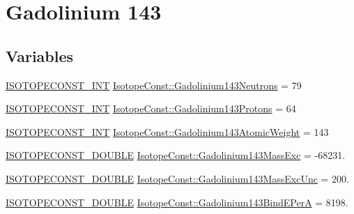 \hypertarget{group___isotope_const-_gadolinium-_gd143}{}\section{Gadolinium 143}
\label{group___isotope_const-_gadolinium-_gd143}
\subsection*{Variables}
\begin{DoxyCompactItemize}
\item 
\mbox{\hyperlink{group___isotope_const-_macros_ga5f18360b3e99483a35c32d789e62621c}{I\+S\+O\+T\+O\+P\+E\+C\+O\+N\+S\+T\+\_\+\+I\+NT}} \mbox{\hyperlink{group___isotope_const-_gadolinium-_gd143_ga43a73a6679a36b76e6d49007fa0e9695}{Isotope\+Const\+::\+Gadolinium143\+Neutrons}} = 79
\item 
\mbox{\hyperlink{group___isotope_const-_macros_ga5f18360b3e99483a35c32d789e62621c}{I\+S\+O\+T\+O\+P\+E\+C\+O\+N\+S\+T\+\_\+\+I\+NT}} \mbox{\hyperlink{group___isotope_const-_gadolinium-_gd143_ga9e40ae4e655deac8515802ceff940a36}{Isotope\+Const\+::\+Gadolinium143\+Protons}} = 64
\item 
\mbox{\hyperlink{group___isotope_const-_macros_ga5f18360b3e99483a35c32d789e62621c}{I\+S\+O\+T\+O\+P\+E\+C\+O\+N\+S\+T\+\_\+\+I\+NT}} \mbox{\hyperlink{group___isotope_const-_gadolinium-_gd143_gad63211f510541410c4db00f5c26230f6}{Isotope\+Const\+::\+Gadolinium143\+Atomic\+Weight}} = 143
\item 
\mbox{\hyperlink{group___isotope_const-_macros_ga8f45a7272ce02c0b4c65c44636ed719a}{I\+S\+O\+T\+O\+P\+E\+C\+O\+N\+S\+T\+\_\+\+D\+O\+U\+B\+LE}} \mbox{\hyperlink{group___isotope_const-_gadolinium-_gd143_gaf3edb4c40f49a1e61bf77e233f82550f}{Isotope\+Const\+::\+Gadolinium143\+Mass\+Exc}} = -\/68231.
\item 
\mbox{\hyperlink{group___isotope_const-_macros_ga8f45a7272ce02c0b4c65c44636ed719a}{I\+S\+O\+T\+O\+P\+E\+C\+O\+N\+S\+T\+\_\+\+D\+O\+U\+B\+LE}} \mbox{\hyperlink{group___isotope_const-_gadolinium-_gd143_ga69c88b9d325ee71bef364bdc06f5e064}{Isotope\+Const\+::\+Gadolinium143\+Mass\+Exc\+Unc}} = 200.
\item 
\mbox{\hyperlink{group___isotope_const-_macros_ga8f45a7272ce02c0b4c65c44636ed719a}{I\+S\+O\+T\+O\+P\+E\+C\+O\+N\+S\+T\+\_\+\+D\+O\+U\+B\+LE}} \mbox{\hyperlink{group___isotope_const-_gadolinium-_gd143_gac97b4401d8732b680e461cb5e7a365ea}{Isotope\+Const\+::\+Gadolinium143\+Bind\+E\+PerA}} = 8198.

\end{DoxyCompactItemize}

